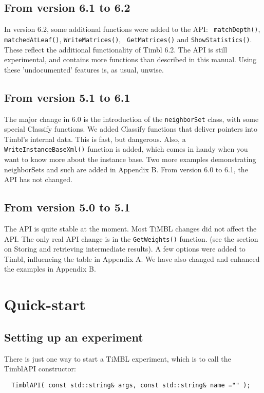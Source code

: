 \documentclass{report}
\begin{document}
\section{From version 6.1 to 6.2}

In version 6.2, some additional functions were added to the API: {\tt
  matchDepth()}, {\tt matchedAtLeaf()}, {\tt WriteMatrices()}, {\tt
  GetMatrices()} and {\tt ShowStatistics()}. These reflect the
additional functionality of Timbl 6.2.  The API is still experimental,
and contains more functions than described in this manual. Using these
'undocumented' features is, as usual, unwise.

\section{From version 5.1 to 6.1}

The major change in 6.0 is the introduction of the {\tt neighborSet}
class, with some special Classify functions.  We added Classify
functions that deliver pointers into Timbl's internal data. This is
fast, but dangerous.  Also, a {\tt WriteInstanceBaseXml()} function is
added, which comes in handy when you want to know more about the
instance base.  Two more examples demonstrating neighborSets and such
are added in Appendix B. From version 6.0 to 6.1, the API has not changed.

\section{From version 5.0 to 5.1}

The API is quite stable at the moment. Most TiMBL changes did not
affect the API. The only real API change is in the {\tt GetWeights()}
function. (see the section on Storing and retrieving intermediate
results).  A few options were added to Timbl, influencing the table in
Appendix A. We have also changed and enhanced the examples in Appendix
B.

\chapter{Quick-start}
\section{Setting up an experiment}

There is just one way to start a TiMBL experiment, which is to call
the TimblAPI constructor:

\begin{footnotesize}
\begin{verbatim}
  TimblAPI( const std::string& args, const std::string& name ="" );
\end{verbatim}
\end{footnotesize}
\end{document}
